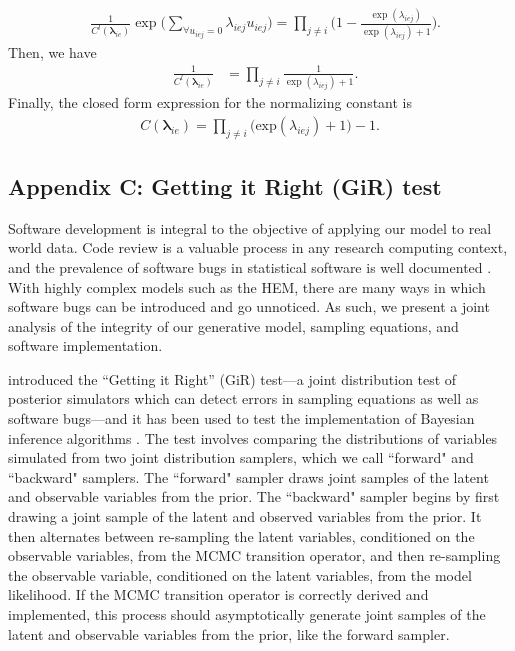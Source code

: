 \documentclass[ba]{imsart}
\numberwithin{equation}{section}
\theoremstyle{plain}
\begin{document}
		\begin{equation*}
			\begin{aligned}
				&\frac{1}{C^{l}(\boldsymbol{\lambda}_{ie})}\exp\Big(\sum\limits_{\forall u_{iej}=0}\lambda_{iej}u_{iej} \Big)= \prod_{j \neq i}   \Big(1-\frac{ \exp{(\lambda_{iej})}}{\exp{(\lambda_{iej})} + 1}\Big).
			\end{aligned}  
		\end{equation*}
		Then, we have 
		\begin{equation*}
			\begin{aligned}
				& \frac{1}{C^{l}(\boldsymbol{\lambda}_{ie})} &= \prod\limits_{j \neq i}\frac{1}{ \exp(\lambda_{iej})+ 1}.
			\end{aligned}  
		\end{equation*}
		Finally, the closed form expression for the normalizing constant is  
		\begin{equation*}
			\begin{aligned}C(\boldsymbol{\lambda}_{ie}) = \prod_{j \neq i} \big(\mbox{exp}(\lambda_{iej}) + 1\big)-1.
			\end{aligned}  
		\end{equation*}
	\subsection*{Appendix C: Getting it Right (GiR) test} \label{subec:GiR}
	Software development is integral to the objective of applying our model to real world data. Code review is a valuable process in any research computing context, and the prevalence of software bugs in statistical software is well documented \citep[e.g., ][]{altman2004numerical,mccullough2009accuracy}.  With highly complex models such as the HEM, there are many ways in which software bugs can be introduced and go unnoticed. As such, we present a joint analysis of the integrity of our generative model, sampling equations, and software implementation. 
	
	\cite{geweke2004getting} introduced the ``Getting it Right'' (GiR) test---a joint distribution test of posterior simulators which can detect errors in sampling equations as well as software bugs---and it has been used to test the implementation of Bayesian inference algorithms \citep{zhao2016bayesian}.  The test involves comparing the distributions of variables simulated from two joint distribution samplers, which we call ``forward" and ``backward" samplers. The ``forward" sampler draws joint samples of the latent and observable variables from the prior. The ``backward" sampler begins by first drawing a joint sample of the latent and observed variables from the prior. It then alternates between re-sampling the latent variables, conditioned on the observable variables, from the MCMC transition operator, and then re-sampling the observable variable, conditioned on the latent variables, from the model likelihood. If the MCMC transition operator is correctly derived and implemented, this process should asymptotically generate joint samples of the latent and observable variables from the prior, like the forward sampler.
	
\end{document}

